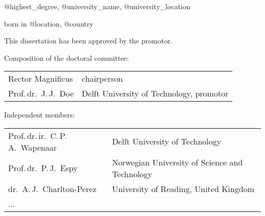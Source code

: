 \begin{titlepage}
\begin{center}
\medskip

@highest\_degree, @university\_name, @university\_location

born in @location, @country

\vspace*{2\bigskipamount}

\end{center}

\clearpage
\thispagestyle{empty}

\noindent This dissertation has been approved by the promotor.



\bigskip
\noindent Composition of the doctoral committee:

\smallskip\noindent
\begin{tabular}{p{5cm}l}
    Rector Magnificus & chairperson \\
    Prof.\,dr.\  J.\,J.\ Doe & Delft University of Technology, promotor\\
\end{tabular}

\bigskip
\noindent Independent members:

\smallskip\noindent
\begin{tabular}{p{5cm}l}
    Prof.\,dr.\,ir.\ C.\,P.\,A.\ Wapenaar & Delft University of Technology \\
    Prof.\,dr.\ P.\,J.\ Espy & Norwegian University of Science and Technology \\
    dr.\ A.\,J.\ Charlton-Perez & University of Reading, United Kingdom \\
    ...
\end{tabular}



\end{titlepage}
